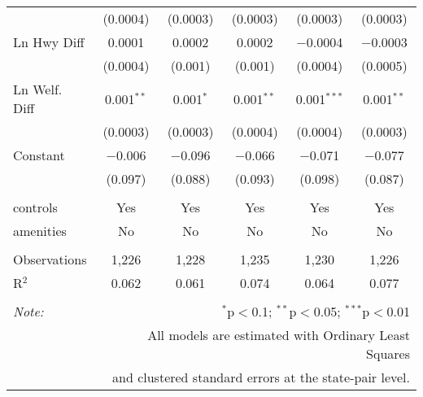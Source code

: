 \begin{table}[!htbp]
\begin{tabular}{@{\extracolsep{5pt}}lccccc}
  & (0.0004) & (0.0003) & (0.0003) & (0.0003) & (0.0003) \\ 
  Ln Hwy Diff & 0.0001 & 0.0002 & 0.0002 & $-$0.0004 & $-$0.0003 \\ 
  & (0.0004) & (0.001) & (0.001) & (0.0004) & (0.0005) \\ 
  Ln Welf. Diff & 0.001$^{**}$ & 0.001$^{*}$ & 0.001$^{**}$ & 0.001$^{***}$ & 0.001$^{**}$ \\ 
  & (0.0003) & (0.0003) & (0.0004) & (0.0004) & (0.0003) \\ 
  Constant & $-$0.006 & $-$0.096 & $-$0.066 & $-$0.071 & $-$0.077 \\ 
  & (0.097) & (0.088) & (0.093) & (0.098) & (0.087) \\ 
 \hline \\[-1.8ex] 
controls & Yes & Yes & Yes & Yes & Yes \\ 
amenities & No & No & No & No & No \\ 
\hline \\[-1.8ex] 
Observations & 1,226 & 1,228 & 1,235 & 1,230 & 1,226 \\ 
R$^{2}$ & 0.062 & 0.061 & 0.074 & 0.064 & 0.077 \\ 
\hline 
\hline \\[-1.8ex] 
\textit{Note:}  & \multicolumn{5}{r}{$^{*}$p$<$0.1; $^{**}$p$<$0.05; $^{***}$p$<$0.01} \\ 
 & \multicolumn{5}{r}{All models are estimated with Ordinary Least Squares} \\ 
 & \multicolumn{5}{r}{and clustered standard errors at the state-pair level.} \\ 
\end{tabular} 
\end{table} 
